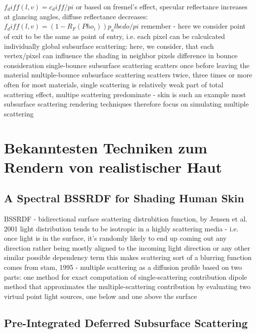 \documentclass[ngerman,runningheads,a4paper]{llncs}[2018/03/10]
\begin{document}
         $f_diff(l, v) = c_diff / pi$
         or based on fresnel's effect, specular reflectance increases at glancing angles, diffuse reflectance decreases: $f_diff(l, v) = (1 - R_F(Pho_i))  p_albedo/pi$
         remember - here we consider point of exit to be the same as point of entry, i.e. each pixel can be calculcated individually
       global subsurface scattering:
         here, we consider, that each vertex/pixel can influence the shading in neighbor pixels
     difference in bounce consideration
       single-bounce subsurface scattering
         scatters once before leaving the material
       multiple-bounce subsurface scattering
         scatters twice, three times or more often
       for most materials, single scattering is relatively weak part of total scattering effect, multipe scattering predominate - skin is such an example
       most subsurface scattering rendering techniques therefore focus on simulating multiple scattering

\section{Bekanntesten Techniken zum Rendern von realistischer Haut}
\label{sec:application}

\subsection{A Spectral BSSRDF for Shading Human Skin}
\label{sub:spectral-bssrdf}

\citet{spectral-bssrdf-human-skin}

 BSSRDF - bidirectional surface scattering distrubition function, by Jensen et al. 2001
         light distribution tends to be isotropic in a highly scattering media - i.e. once light is in the surface, it's randomly likely to end up coming out any direction rather being mostly aligned to the incoming light direction or any other similar possible dependency term
           this makes scattering sort of a blurring function
             comes from stam, 1995 - multiple scattering as a diffusion profile
           based on two parts:
             one method for exact computation of single-scattering contribution
             dipole method that approximates the multiple-scattering contribution by evaluating two virtual point light sources, one below and one above the surface

\subsection{Pre-Integrated Deferred Subsurface Scattering}
\label{sub:pre-integrated}
\end{document}
